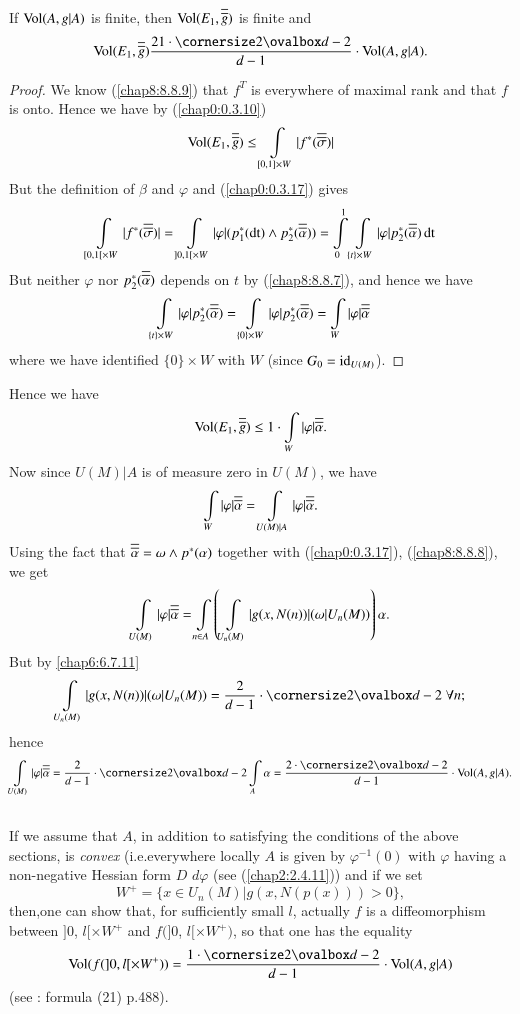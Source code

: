 \begin{prop*}
If $\operatorname{Vol}(A,g|A)$ is finite, then $\operatorname{Vol}(E_{1},\overline{\overline{g}})$ is finite and
$$
\Vol(E_{1},\oob{g})\frac{21\cdot\oval{d-2}}{d-1}\cdot \Vol(A,g|A).
$$
\end{prop*}

\begin{proof}
We know (\ref{chap8:8.8.9}) that $f^{T}$ is everywhere of maximal rank
and that $f$ is onto. Hence we have by (\ref{chap0:0.3.10})
$$
\operatorname{Vol}(E_{1},\overline{\overline{g}})\leq \int\limits_{[0,1]\times W}|f^{\ast}(\overline{\overline{\sigma}})|
$$
But the definition of $\beta$ and $\varphi$ and (\ref{chap0:0.3.17}) gives
$$
\int\limits_{[0,1[\times
      W}|f^{\ast}(\overline{\overline{\sigma}})|=\int\limits_{]0,1[\times
      W}|\varphi|(p^{\ast}_{1}(\operatorname{dt})\wedge
    p^{\ast}_{2}(\overline{\overline{\alpha}}))=\int\limits^{1}_{0}
    \int\limits_{\{t\}\times W}|\varphi|p^{\ast}_{2}(\overline{\overline{\alpha}})\operatorname{dt} 
$$\pageoriginale
But neither $\varphi$ nor $p^{\ast}_{2}(\overline{\overline{\alpha}})$ depends on $t$
by (\ref{chap8:8.8.7}), and hence we have
$$
\int\limits_{\{t\}\times
  W}|\varphi|p^{\ast}_{2}(\overline{\overline{\alpha}})=\int\limits_{\{0\}\times
  W}|\varphi|p^{\ast}_{2}(\overline{\overline{\alpha}})=\int\limits_{W}|\varphi|\overline{\overline{\alpha}}
$$
where we have identified $\{0\}\times W$ with $W$ (since $G_{0}=\operatorname{id}_{U(M)}$).
\end{proof}

Hence we have
$$
\operatorname{Vol}(E_{1},\overline{\overline{g}})\leq 1\cdot\int\limits_{W}|\varphi|\overline{\overline{\alpha}}.
$$
Now since $U(M)|A$ is of measure zero in $U(M)$, we have
$$
\int\limits_{W}|\varphi|\overline{\overline{\alpha}}=\int\limits_{U(M)|A}|\varphi|\overline{\overline{\alpha}}.
$$
Using the fact that $\overline{\overline{\alpha}}=\omega\wedge p^{\ast}(\alpha)$
together with (\ref{chap0:0.3.17}), (\ref{chap8:8.8.8}), we get
$$
\int\limits_{U(M)}|\varphi|\overline{\overline{\alpha}}=\int\limits_{n\in
  A}\left(\int\limits_{U_{n}(M)}|g(x,N(n))|(\omega|U_{n}(M))\right)\alpha. 
$$
But by \eqref{chap6:6.7.11}
$$
\int\limits_{U_{n}(M)}|g(x,N(n))|(\omega|U_{n}(M))=\frac{2}{d-1}\cdot\oval{d-2}
\; \forall n;
$$
hence
$$
\int\limits_{U(M)}|\varphi|\oob{\alpha}=\frac{2}{d-1}\cdot\oval{d-2}\int\limits_{A}\alpha=\frac{2\cdot\oval{d-2}}{d-1}\cdot
\Vol(A,g|A).
$$


\subsection{}\label{chap8:8.8.11}

\begin{remark*}
If we assume that $A$, in addition to satisfying the conditions of the
above sections, is {\em convex} (i.e.\@ everywhere locally $A$ is
given by $\varphi^{-1}(0)$ with $\varphi$ having a non-negative
Hessian form $D$ $d\varphi$ (see (\ref{chap2:2.4.11})) and if we set
$$
W^{+}=\{x\in U_{n}(M)|g(x,N(p(x)))>0\},
$$
then,\pageoriginale one can show that, for sufficiently small $l$,
actually $f$ is a diffeomorphism between $]0$, $l[\times W^{+}$ and
    $f(]0$, $l[\times W^{+})$, so that one has the equality
$$
\Vol(f(]0, l[\times W^{+}))=\frac{1\cdot \oval{d-2}}{d-1}\cdot \Vol(A,g|A)
$$
(see \cite{27}: formula (21) p.\@ 488).
\end{remark*}

